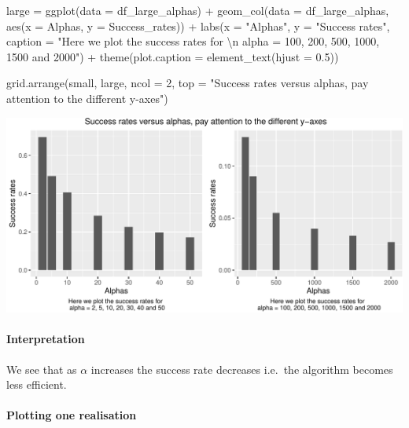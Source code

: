 \documentclass[
]{article}
\newenvironment{Shaded}{\begin{snugshade}}{\end{snugshade}}
\newcommand{\AttributeTok}[1]{\textcolor[rgb]{0.77,0.63,0.00}{#1}}
\newcommand{\DecValTok}[1]{\textcolor[rgb]{0.00,0.00,0.81}{#1}}
\newcommand{\FloatTok}[1]{\textcolor[rgb]{0.00,0.00,0.81}{#1}}
\newcommand{\FunctionTok}[1]{\textcolor[rgb]{0.00,0.00,0.00}{#1}}
\newcommand{\NormalTok}[1]{#1}
\newcommand{\OtherTok}[1]{\textcolor[rgb]{0.56,0.35,0.01}{#1}}
\newcommand{\SpecialCharTok}[1]{\textcolor[rgb]{0.00,0.00,0.00}{#1}}
\newcommand{\StringTok}[1]{\textcolor[rgb]{0.31,0.60,0.02}{#1}}
\begin{document}
\begin{Shaded}
\begin{Highlighting}[]
\NormalTok{large }\OtherTok{=} \FunctionTok{ggplot}\NormalTok{(}\AttributeTok{data =}\NormalTok{ df\_large\_alphas) }\SpecialCharTok{+} \FunctionTok{geom\_col}\NormalTok{(}\AttributeTok{data =}\NormalTok{ df\_large\_alphas, }\FunctionTok{aes}\NormalTok{(}\AttributeTok{x =}\NormalTok{ Alphas, }
    \AttributeTok{y =}\NormalTok{ Success\_rates)) }\SpecialCharTok{+} \FunctionTok{labs}\NormalTok{(}\AttributeTok{x =} \StringTok{"Alphas"}\NormalTok{, }\AttributeTok{y =} \StringTok{"Success rates"}\NormalTok{, }\AttributeTok{caption =} \StringTok{"Here we plot the success rates for }\SpecialCharTok{\textbackslash{}n}\StringTok{ alpha = 100, 200, 500, 1000, 1500 and 2000"}\NormalTok{) }\SpecialCharTok{+} 
    \FunctionTok{theme}\NormalTok{(}\AttributeTok{plot.caption =} \FunctionTok{element\_text}\NormalTok{(}\AttributeTok{hjust =} \FloatTok{0.5}\NormalTok{))}


\FunctionTok{grid.arrange}\NormalTok{(small, large, }\AttributeTok{ncol =} \DecValTok{2}\NormalTok{, }\AttributeTok{top =} \StringTok{"Success rates versus alphas, pay attention to the different y{-}axes"}\NormalTok{)}
\end{Highlighting}
\end{Shaded}

\begin{center}\includegraphics{Project-1_files/figure-latex/unnamed-chunk-7-1} \end{center}

\hypertarget{interpretation}{%
\paragraph{Interpretation}\label{interpretation}}

We see that as \(\alpha\) increases the success rate decreases i.e.~the
algorithm becomes less efficient.

\hypertarget{plotting-one-realisation}{%
\paragraph{Plotting one realisation}\label{plotting-one-realisation}}
\end{document}
